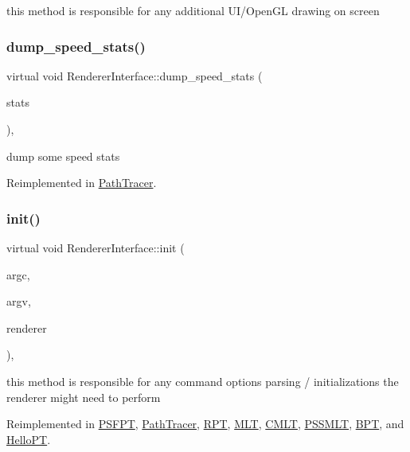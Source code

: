 this method is responsible for any additional U\+I/\+Open\+GL drawing on screen \mbox{\label{struct_renderer_interface_a378df3aa18095da5ce8011fb25c8fb8e}} 
\subsubsection{\texorpdfstring{dump\+\_\+speed\+\_\+stats()}{dump\_speed\_stats()}}
{\footnotesize\ttfamily virtual void Renderer\+Interface\+::dump\+\_\+speed\+\_\+stats (\begin{DoxyParamCaption}\item[{F\+I\+LE $\ast$}]{stats }\end{DoxyParamCaption})\hspace{0.3cm}{\ttfamily [inline]}, {\ttfamily [virtual]}}

dump some speed stats 

Reimplemented in \hyperlink{group___p_t_module_details_gaae1782405577d0072ff78570ec0025cc}{Path\+Tracer}.

\mbox{\label{struct_renderer_interface_a2ead9b943d6d48fcd32872e0005ebe63}} 
\subsubsection{\texorpdfstring{init()}{init()}}
{\footnotesize\ttfamily virtual void Renderer\+Interface\+::init (\begin{DoxyParamCaption}\item[{int}]{argc,  }\item[{char $\ast$$\ast$}]{argv,  }\item[{\hyperlink{struct_rendering_context}{Rendering\+Context} \&}]{renderer }\end{DoxyParamCaption})\hspace{0.3cm}{\ttfamily [inline]}, {\ttfamily [virtual]}}

this method is responsible for any command options parsing / initializations the renderer might need to perform 

Reimplemented in \hyperlink{struct_p_s_f_p_t_ad44f7f2769bcae6881eebf04a99f57ef}{P\+S\+F\+PT}, \hyperlink{group___p_t_module_details_ga923b8d146b23f93356f6c74971c4d6f7}{Path\+Tracer}, \hyperlink{struct_r_p_t_ae840ee9e9ef3939729ef0bb653c19f9e}{R\+PT}, \hyperlink{struct_m_l_t_a3e5f5dc01f80a3c599384660163ad3d7}{M\+LT}, \hyperlink{struct_c_m_l_t_a16f9c8c63c6027478854528963cf4ccf}{C\+M\+LT}, \hyperlink{struct_p_s_s_m_l_t_a77d66c7cc0d195f62cedb29c15f845bd}{P\+S\+S\+M\+LT}, \hyperlink{struct_b_p_t_a45040344b72bde12d338c2b1969fba64}{B\+PT}, and \hyperlink{struct_hello_p_t_a8ec59e3fac8eff801cecdd3220cd8d41}{Hello\+PT}.

